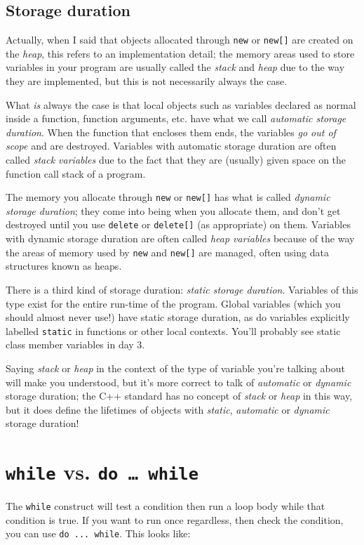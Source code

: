 \documentclass[a4paper]{scrartcl}
\begin{document}
\subsection{Storage duration}
Actually, when I said that objects allocated through \verb|new| or \verb|new[]| are created on the \emph{heap}, this refers to an implementation detail; the memory areas used to store variables in your program are usually called the \emph{stack} and \emph{heap} due to the way they are implemented, but this is not necessarily always the case.

What \emph{is} always the case is that local objects such as variables declared as normal inside a function, function arguments, etc. have what we call \emph{automatic storage duration}. When the function that encloses them ends, the variables \emph{go out of scope} and are destroyed. Variables with automatic storage duration are often called \emph{stack variables} due to the fact that they are (usually) given space on the function call stack of a program.

The memory you allocate through \verb|new| or \verb|new[]| has what is called \emph{dynamic storage duration}; they come into being when you allocate them, and don't get destroyed until you use \verb|delete| or \verb|delete[]| (as appropriate) on them. Variables with dynamic storage duration are often called \emph{heap variables} because of the way the areas of memory used by \verb|new| and \verb|new[]| are managed, often using data structures known as heaps.

There is a third kind of storage duration: \emph{static storage duration}. Variables of this type exist for the entire run-time of the program. Global variables (which you should almost never use!) have static storage duration, as do variables explicitly labelled \verb|static| in functions or other local contexts. You'll probably see static class member variables in day 3.

Saying \emph{stack} or \emph{heap} in the context of the type of variable you're talking about will make you understood, but it's more correct to talk of \emph{automatic} or \emph{dynamic} storage duration; the C++ standard has no concept of \emph{stack} or \emph{heap} in this way, but it does define the lifetimes of objects with \emph{static}, \emph{automatic} or \emph{dynamic} storage duration!

\section{\texttt{while} vs. \texttt{do \ldots\ while}}
The \verb|while| construct will test a condition then run a loop body while that condition is true. If you want to run once regardless, then check the condition, you can use \verb|do ... while|. This looks like:
\end{document}
